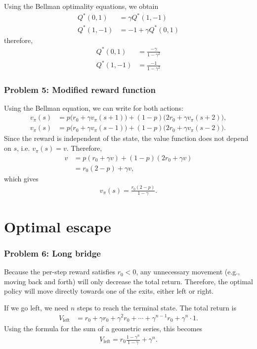 \documentclass[12pt,twoside]{article}
\begin{document}
Using the Bellman optimality equations, we obtain
\begin{align}
Q^*(0,1) & = \gamma Q^*(1,-1) \\
Q^*(1,-1) & = -1 + \gamma Q^*(0,1)
\end{align}
therefore,
\begin{align}
Q^*(0,1) & = \frac{-\gamma}{1 - \gamma^2} \\
Q^*(1,-1) & = \frac{-1}{1 - \gamma^2}
\end{align}
	
\subsubsection*{{\color{red}Problem 5:  Modified reward function}}
	
Using the Bellman equation, we can write for both actions:
\begin{align}
v_\pi(s) &= p \big(r_0 + \gamma v_\pi(s+1)\big)
+ (1-p)\big(2r_0 + \gamma v_\pi(s+2)\big), \\
v_\pi(s) &= p \big(r_0 + \gamma v_\pi(s-1)\big)
+ (1-p)\big(2r_0 + \gamma v_\pi(s-2)\big).
\end{align}
Since the reward is independent of the state, the value function does not depend on $s$, i.e. $v_\pi(s)=v$. Therefore,
\begin{align}
v &= p(r_0 + \gamma v) + (1-p)(2r_0 + \gamma v) \\
  &= r_0(2 - p) + \gamma v,
\end{align}
which gives
\begin{align}
v_\pi(s) = \frac{r_0(2 - p)}{1 - \gamma}.
\end{align}

\section{Optimal escape}
\subsubsection*{{\color{red}Problem 6:  Long bridge}}
	
Because the per-step reward satisfies $r_0 < 0$, any unnecessary movement (e.g., moving back and forth) will only decrease the total return. Therefore, the optimal policy will move directly towards one of the exits, either left or right.

If we go left, we need $n$ steps to reach the terminal state. The total return is
\begin{align}
V_{\text{left}} &= r_0 + \gamma r_0 + \gamma^2 r_0 + \cdots + \gamma^{n-1} r_0 + \gamma^n \cdot 1.
\end{align}
Using the formula for the sum of a geometric series, this becomes
\begin{align}
V_{\text{left}} = r_0 \frac{1 - \gamma^n}{1 - \gamma} + \gamma^n.
\end{align}
\end{document}

